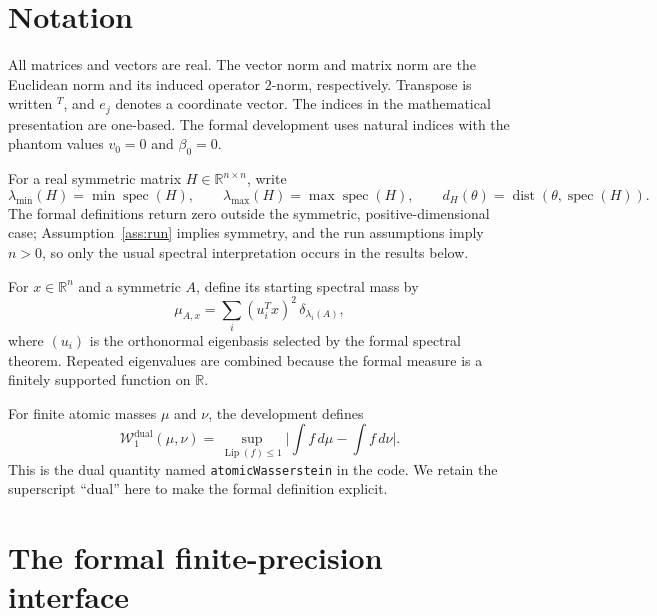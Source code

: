 \documentclass[11pt]{article}
\newcommand{\R}{\mathbb{R}}
\newcommand{\abs}[1]{\lvert #1\rvert}
\newcommand{\dist}{\operatorname{dist}}
\newcommand{\spec}{\operatorname{spec}}
\newcommand{\Wone}{\mathcal W_1^{\mathrm{dual}}}
\newcommand{\lean}[1]{\texorpdfstring{\textcolor{leanblue}{\nolinkurl{#1}}}{#1}}
\theoremstyle{definition}
\begin{document}
\section{Notation}

All matrices and vectors are real.  The vector norm and matrix norm are the
Euclidean norm and its induced operator $2$-norm, respectively.  Transpose is
written ${}^{T}$, and $e_j$ denotes a coordinate vector.  The indices in the
mathematical presentation are one-based.  The formal development uses natural
indices with the phantom values $v_0=0$ and $\beta_0=0$.

For a real symmetric matrix $H\in\R^{n\times n}$, write
\[
  \lambda_{\min}(H)=\min\spec(H),\qquad
  \lambda_{\max}(H)=\max\spec(H),
  \qquad
  d_H(\theta)=\dist(\theta,\spec(H)).
\]
The formal definitions return zero outside the symmetric, positive-dimensional
case; Assumption~\ref{ass:run} implies symmetry, and the run assumptions imply
$n>0$, so only the usual spectral interpretation occurs in the results below.

For $x\in\R^n$ and a symmetric $A$, define its starting spectral mass by
\begin{equation}\label{eq:spectral-measure}
  \mu_{A,x}=\sum_i (u_i^Tx)^2\,\delta_{\lambda_i(A)},
\end{equation}
where $(u_i)$ is the orthonormal eigenbasis selected by the formal spectral
theorem.  Repeated eigenvalues are combined because the formal measure is a
finitely supported function on $\R$.

For finite atomic masses $\mu$ and $\nu$, the development defines
\begin{equation}\label{eq:dual-wasserstein}
 \Wone(\mu,\nu)
 =\sup_{\operatorname{Lip}(f)\leq 1}
   \abs{\int f\,d\mu-\int f\,d\nu}.
\end{equation}
This is the dual quantity named \lean{atomicWasserstein} in the code.  We retain
the superscript ``dual'' here to make the formal definition explicit.

\section{The formal finite-precision interface}
\end{document}
